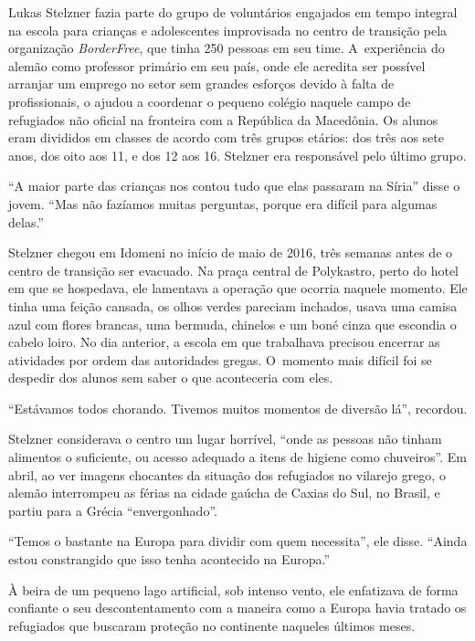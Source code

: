 Lukas Stelzner fazia parte do grupo de voluntários engajados em tempo
integral na escola para crianças e adolescentes improvisada no centro de
transição pela organização \emph{BorderFree}, que tinha 250 pessoas em
seu time. A~experiência do alemão como professor primário em seu país,
onde ele acredita ser possível arranjar um emprego no setor sem grandes
esforços devido à falta de profissionais, o ajudou a coordenar o pequeno
colégio naquele campo de refugiados não oficial na fronteira com a
República da Macedônia. Os alunos eram divididos em classes de acordo
com três grupos etários: dos três aos sete anos, dos oito aos 11, e dos
12 aos 16. Stelzner era responsável pelo último grupo.

``A maior parte das crianças nos contou tudo que elas passaram na
Síria'' disse o jovem. ``Mas não fazíamos muitas perguntas, porque era
difícil para algumas delas.''


Stelzner chegou em Idomeni no início de maio de 2016, três semanas antes
de o centro de transição ser evacuado. Na praça central de Polykastro,
perto do hotel em que se hospedava, ele lamentava a operação que ocorria
naquele momento. Ele tinha uma feição cansada, os olhos verdes pareciam
inchados, usava uma camisa azul com flores brancas, uma bermuda, chinelos
e um boné cinza que escondia o cabelo loiro. No dia anterior, a escola em
que trabalhava precisou encerrar as atividades por ordem das autoridades
gregas. O~momento mais difícil foi se despedir dos alunos sem saber o
que aconteceria com eles.

``Estávamos todos chorando. Tivemos muitos momentos de
diversão lá'', recordou.

Stelzner considerava o centro um lugar horrível, ``onde as pessoas não
tinham alimentos o suficiente, ou acesso adequado a itens de higiene
como chuveiros''. Em abril, ao ver imagens chocantes da situação dos
refugiados no vilarejo grego, o alemão interrompeu as férias na cidade
gaúcha de Caxias do Sul, no Brasil, e partiu para a Grécia
``envergonhado''.

``Temos o bastante na Europa para dividir com quem necessita'', ele disse.
``Ainda estou constrangido que isso tenha acontecido na Europa.''

À beira de um pequeno lago artificial, sob intenso vento, ele enfatizava
de forma confiante o seu descontentamento com a maneira como a Europa
havia tratado os refugiados que buscaram proteção no continente naqueles
últimos meses.

